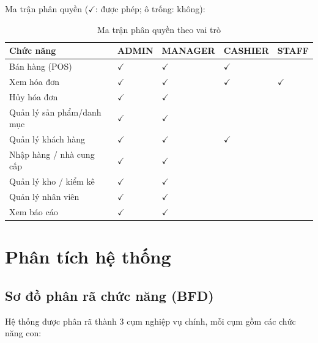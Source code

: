 \documentclass[12pt,a4paper]{report}
\newcommand{\yes}{\ensuremath{\checkmark}}
\begin{document}
\noindent Ma trận phân quyền (\yes: được phép; ô trống: không):
\begin{table}[H]
\centering\small
\begin{tabularx}{\textwidth}{|X|C{1.7cm}|C{2.2cm}|C{2.2cm}|C{1.6cm}|}
\hline
\textbf{Chức năng} & \textbf{ADMIN} & \textbf{MANAGER} & \textbf{CASHIER} & \textbf{STAFF} \\ \hline
Bán hàng (POS)            & \yes & \yes & \yes &   \\ \hline
Xem hóa đơn               & \yes & \yes & \yes & \yes \\ \hline
Hủy hóa đơn               & \yes & \yes &   &   \\ \hline
Quản lý sản phẩm/danh mục & \yes & \yes &   &   \\ \hline
Quản lý khách hàng        & \yes & \yes & \yes &   \\ \hline
Nhập hàng / nhà cung cấp  & \yes & \yes &   &   \\ \hline
Quản lý kho / kiểm kê     & \yes & \yes &   &   \\ \hline
Quản lý nhân viên         & \yes & \yes &   &   \\ \hline
Xem báo cáo               & \yes & \yes &   &   \\ \hline
\end{tabularx}
\caption{Ma trận phân quyền theo vai trò}
\end{table}

\chapter{Phân tích hệ thống}

\section{Sơ đồ phân rã chức năng (BFD)}
Hệ thống được phân rã thành 3 cụm nghiệp vụ chính, mỗi cụm gồm các chức năng con:
\end{document}
